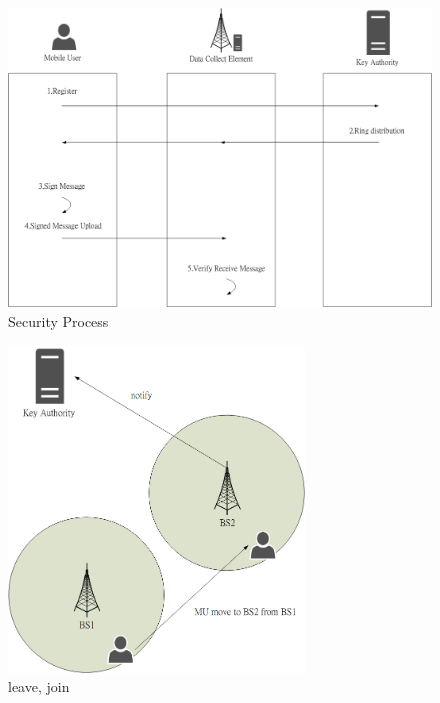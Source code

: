 \documentclass{beamer}
\begin{document}
\begin{frame}{}
    \begin{figure}[t]
        \centering
        \includegraphics[width=1.0\textwidth]{figures/2.png}
        \caption{Security Process}
    \end{figure}
\end{frame}
\begin{frame}{}
    \begin{figure}[t]
        \centering
        \includegraphics[width=0.7\textwidth]{figures/3.png}
        \caption{leave, join}
    \end{figure}
\end{frame}
\end{document}
